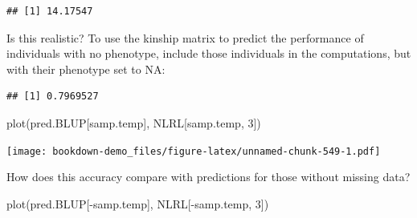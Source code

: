 \documentclass[
]{book}
\newenvironment{Shaded}{\begin{snugshade}}{\end{snugshade}}
\newcommand{\AttributeTok}[1]{\textcolor[rgb]{0.77,0.63,0.00}{#1}}
\newcommand{\ConstantTok}[1]{\textcolor[rgb]{0.00,0.00,0.00}{#1}}
\newcommand{\DecValTok}[1]{\textcolor[rgb]{0.00,0.00,0.81}{#1}}
\newcommand{\FunctionTok}[1]{\textcolor[rgb]{0.00,0.00,0.00}{#1}}
\newcommand{\NormalTok}[1]{#1}
\newcommand{\OtherTok}[1]{\textcolor[rgb]{0.56,0.35,0.01}{#1}}
\newcommand{\SpecialCharTok}[1]{\textcolor[rgb]{0.00,0.00,0.00}{#1}}
\begin{document}
\begin{verbatim}
## [1] 14.17547
\end{verbatim}

Is this realistic? To use the kinship matrix to predict the performance of individuals with no phenotype, include those individuals in the computations, but with their phenotype set to NA:

\begin{Shaded}
\end{Shaded}

\begin{verbatim}
## [1] 0.7969527
\end{verbatim}

\begin{Shaded}
\begin{Highlighting}[]
\FunctionTok{plot}\NormalTok{(pred.BLUP[samp.temp], NLRL[samp.temp, }\DecValTok{3}\NormalTok{])}
\end{Highlighting}
\end{Shaded}

\texttt{[image: bookdown-demo\_files/figure-latex/unnamed-chunk-549-1.pdf]}

How does this accuracy compare with predictions for those without missing data?

\begin{Shaded}
\begin{Highlighting}[]
\FunctionTok{plot}\NormalTok{(pred.BLUP[}\SpecialCharTok{{-}}\NormalTok{samp.temp], NLRL[}\SpecialCharTok{{-}}\NormalTok{samp.temp, }\DecValTok{3}\NormalTok{])}
\end{Highlighting}
\end{Shaded}
\end{document}
